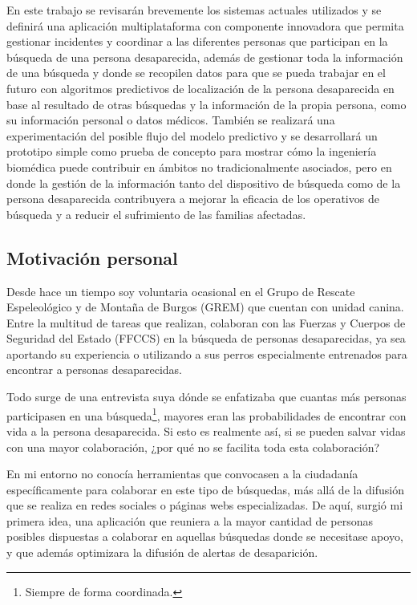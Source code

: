     En este trabajo se revisarán brevemente los sistemas actuales utilizados y se definirá una aplicación multiplataforma con componente innovadora que permita gestionar incidentes y coordinar a las diferentes personas que participan en la búsqueda de una persona desaparecida, además de gestionar toda la información de una búsqueda y donde se recopilen datos para que se pueda trabajar en el futuro con algoritmos predictivos de localización de la persona desaparecida en base al resultado de otras búsquedas y la información de la propia persona, como su información personal o datos médicos. También se realizará una experimentación del posible flujo del modelo predictivo y se desarrollará un prototipo simple como prueba de concepto para mostrar cómo la ingeniería biomédica puede contribuir en ámbitos no tradicionalmente asociados, pero en donde la gestión de la información tanto del dispositivo de búsqueda como de la persona desaparecida contribuyera a mejorar la eficacia de los operativos de búsqueda y a reducir el sufrimiento de las familias afectadas.

    
    \subsection{Motivación personal}
    
    Desde hace un tiempo soy voluntaria ocasional en el Grupo de Rescate Espeleológico y de Montaña de Burgos (GREM)  que cuentan con unidad canina. Entre la multitud de tareas que realizan, colaboran con las Fuerzas y Cuerpos de Seguridad del Estado (FFCCS) en la búsqueda de personas desaparecidas, ya sea aportando su experiencia o utilizando a sus perros especialmente entrenados para encontrar a personas desaparecidas. 
    
    Todo surge de una entrevista suya dónde se enfatizaba que cuantas más personas participasen en una búsqueda\footnote{Siempre de forma coordinada.}, mayores eran las probabilidades de encontrar con vida a la persona desaparecida. Si esto es realmente así, si se pueden salvar vidas con una mayor colaboración, ¿por qué no se facilita toda esta colaboración? 

    
    En mi entorno no conocía herramientas que convocasen a la ciudadanía específicamente para colaborar en este tipo de búsquedas, más allá de la difusión que se realiza en redes sociales o páginas webs especializadas. De aquí, surgió mi primera idea, una aplicación que reuniera a la mayor cantidad de personas posibles dispuestas a colaborar en aquellas búsquedas donde se necesitase apoyo, y que además optimizara la difusión de alertas de desaparición.
        
